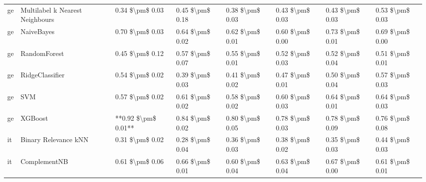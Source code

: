 \begin{tabular}{llllllll}
      ge & Multilabel k Nearest Neighbours &     0.34 \$\textbackslash pm\$ 0.03 &           0.45 \$\textbackslash pm\$ 0.18 &       0.38 \$\textbackslash pm\$ 0.03 &        0.43 \$\textbackslash pm\$ 0.03 &                         0.43 \$\textbackslash pm\$ 0.03 &     0.53 \$\textbackslash pm\$ 0.03 \\
      ge &                      NaiveBayes &     0.70 \$\textbackslash pm\$ 0.03 &           0.64 \$\textbackslash pm\$ 0.02 &       0.62 \$\textbackslash pm\$ 0.01 &        0.60 \$\textbackslash pm\$ 0.00 &                         0.73 \$\textbackslash pm\$ 0.01 &     0.69 \$\textbackslash pm\$ 0.00 \\
      ge &                    RandomForest &     0.45 \$\textbackslash pm\$ 0.12 &           0.57 \$\textbackslash pm\$ 0.07 &       0.55 \$\textbackslash pm\$ 0.01 &        0.52 \$\textbackslash pm\$ 0.03 &                         0.52 \$\textbackslash pm\$ 0.04 &     0.51 \$\textbackslash pm\$ 0.01 \\
      ge &                 RidgeClassifier &     0.54 \$\textbackslash pm\$ 0.02 &           0.39 \$\textbackslash pm\$ 0.03 &       0.41 \$\textbackslash pm\$ 0.02 &        0.47 \$\textbackslash pm\$ 0.01 &                         0.50 \$\textbackslash pm\$ 0.04 &     0.57 \$\textbackslash pm\$ 0.03 \\
      ge &                             SVM &     0.57 \$\textbackslash pm\$ 0.02 &           0.61 \$\textbackslash pm\$ 0.02 &       0.58 \$\textbackslash pm\$ 0.02 &        0.60 \$\textbackslash pm\$ 0.03 &                         0.64 \$\textbackslash pm\$ 0.01 &     0.64 \$\textbackslash pm\$ 0.03 \\
      ge &                         XGBoost & **0.92 \$\textbackslash pm\$ 0.01** &           0.84 \$\textbackslash pm\$ 0.02 &       0.80 \$\textbackslash pm\$ 0.05 &        0.78 \$\textbackslash pm\$ 0.03 &                         0.78 \$\textbackslash pm\$ 0.09 &     0.76 \$\textbackslash pm\$ 0.08 \\
      it &            Binary Relevance kNN &     0.31 \$\textbackslash pm\$ 0.02 &           0.28 \$\textbackslash pm\$ 0.04 &       0.36 \$\textbackslash pm\$ 0.03 &        0.38 \$\textbackslash pm\$ 0.02 &                         0.35 \$\textbackslash pm\$ 0.03 &     0.44 \$\textbackslash pm\$ 0.03 \\
      it &                    ComplementNB &     0.61 \$\textbackslash pm\$ 0.06 &           0.66 \$\textbackslash pm\$ 0.01 &       0.60 \$\textbackslash pm\$ 0.04 &        0.63 \$\textbackslash pm\$ 0.04 &                         0.67 \$\textbackslash pm\$ 0.00 &     0.61 \$\textbackslash pm\$ 0.01 \\

\end{tabular}
